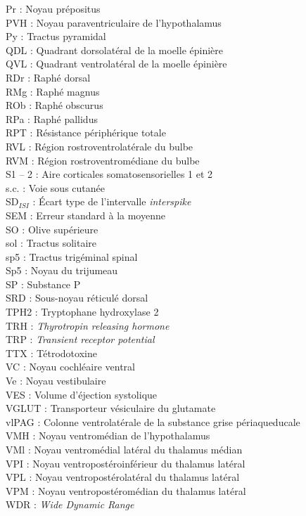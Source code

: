 \documentclass[a4paper,12pt,twoside]{report}
\begin{document}
\begin{singlespacing}
\begin{multicols}{2}
Pr : Noyau prépositus\\
PVH : Noyau paraventriculaire de l’hypothalamus\\
Py : Tractus pyramidal\\
QDL : Quadrant dorsolatéral de la moelle épinière\\
QVL : Quadrant ventrolatéral de la moelle épinière\\
RDr : Raphé dorsal\\
RMg : Raphé magnus\\
ROb : Raphé obscurus\\
RPa : Raphé pallidus\\
RPT : Résistance périphérique totale\\
RVL : Région rostroventrolatérale du bulbe\\
RVM : Région rostroventromédiane du bulbe\\
S1 – 2 : Aire corticales somatosensorielles 1 et 2\\
s.c. : Voie sous cutanée\\
SD$_{ISI}$ : \' Ecart type de l’intervalle \textit{interspike}\\
SEM : Erreur standard à la moyenne\\
SO : Olive supérieure\\
sol : Tractus solitaire\\
sp5 : Tractus trigéminal spinal\\
Sp5 : Noyau du trijumeau\\
SP : Substance P\\
SRD : Sous-noyau réticulé dorsal\\
TPH2 : Tryptophane hydroxylase 2\\
TRH : \textit{Thyrotropin releasing hormone}\\
TRP : \textit{Transient receptor potential}\\
TTX : Tétrodotoxine\\
VC : Noyau cochléaire ventral\\
Ve : Noyau vestibulaire\\
VES : Volume d’éjection systolique\\
VGLUT : Transporteur vésiculaire du glutamate\\
vlPAG : Colonne ventrolatérale de la substance grise périaqueducale\\ 
VMH : Noyau ventromédian de l’hypothalamus\\
VMl : Noyau ventromédial latéral du thalamus médian\\
VPI : Noyau ventropostéroinférieur du thalamus latéral\\
VPL : Noyau ventropostérolatéral du thalamus latéral\\
VPM : Noyau ventropostéromédian du thalamus latéral\\
WDR : \textit{Wide Dynamic Range}

\end{multicols}

\end{singlespacing}
\end{document}
